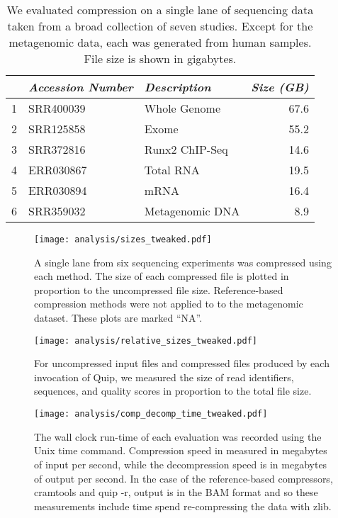 \documentclass[twocolumn]{article}
\begin{document}
\begin{table}
\begin{tabular}{rllr}
  & \textit{Accession Number} & \textit{Description} & \textit{Size (GB)} \\ \hline
1 & SRR400039                 & Whole Genome         & 67.6 \\
2 & SRR125858                 & Exome                & 55.2 \\
3 & SRR372816                 & Runx2 ChIP-Seq       & 14.6 \\
4 & ERR030867                 & Total RNA            & 19.5 \\
5 & ERR030894                 & mRNA                 & 16.4 \\
6 & SRR359032                 & Metagenomic DNA      &  8.9 \\
\end{tabular}
\caption{
We evaluated compression on a single lane of sequencing data taken from a
broad collection of seven studies. Except for the metagenomic data, each was
generated from human samples. File size is shown in gigabytes.
}
\label{tab:datasets}
\end{table}


\begin{figure*}
\centerline{\texttt{[image: analysis/sizes\_tweaked.pdf]}}
\caption{
A single lane from six sequencing experiments was compressed using each
method. The size of each compressed file is plotted in proportion to the
uncompressed file size. Reference-based compression methods were not applied to
to the metagenomic dataset. These plots are marked ``NA''.
}
\label{fig:sizes}
\end{figure*}


\begin{figure*}
\centerline{\texttt{[image: analysis/relative\_sizes\_tweaked.pdf]}}
\caption{For uncompressed input files and compressed files produced by each invocation of Quip, we measured the size of read identifiers, sequences, and quality scores in proportion to the total file size.}
\label{fig:relative_sizes}
\end{figure*}

\begin{figure*}
\centerline{\texttt{[image: analysis/comp\_decomp\_time\_tweaked.pdf]}}
\caption{
The wall clock run-time of each evaluation was recorded using the Unix time
command. Compression speed in measured in megabytes of input per second, while
the decompression speed is in megabytes of output per second. In the case of
the reference-based compressors, cramtools and quip -r, output is in the BAM
format and so these measurements include time spend re-compressing the data
with zlib.
}
\label{fig:comp_decomp_time}
\end{figure*}
\end{document}
